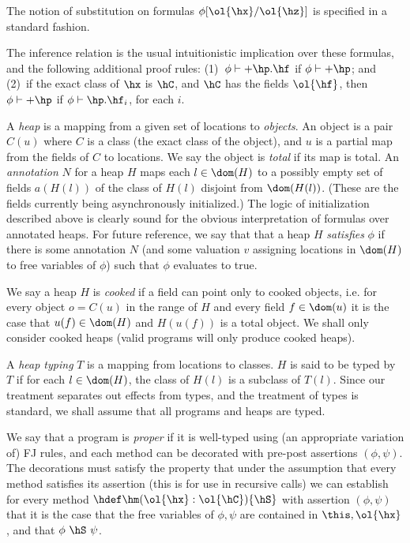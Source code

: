 The notion of substitution on formulas $\phi\char`[\ol{\hx}/\ol{\hz}\char`]$ is
specified in a standard fashion.

The inference relation is the usual intuitionistic implication over
these formulas, and the following additional proof rules: 
(1)~$\phi\vdash +\hp.\hf$ if $\phi\vdash +\hp$; and (2)~if
the exact class of $\hx$ is $\hC$, and $\hC$ has the fields $\ol{\hf}$,
then $\phi\vdash +\hp$ if $\phi\vdash \hp.\hf_i$, for each $i$. 

A {\em heap} is a mapping from a given set of locations to {\em
  objects}. An object is a pair $C(u)$ where $C$ is a class (the exact
class of the object), and $u$ is a partial map from the fields of $C$
to locations. We say the object is {\em total} if its map is total.
An {\em annotation} $N$ for a heap $H$ maps each $l \in \dom(H)$ to a
possibly empty set of fields $a(H(l))$ of the class of $H(l)$ disjoint
from $\dom(H(l))$. (These are the fields currently being
asynchronously initialized.) The logic of initialization described
above is clearly sound for the obvious interpretation of formulas over
annotated heaps. For future reference, we say that that a heap $H$
{\em satisfies} $\phi$ if there is some annotation $N$ (and some
valuation $v$ assigning locations in $\dom(H)$ to free variables of
$\phi$) such that $\phi$ evaluates to true. 

We say a heap $H$ is {\em cooked} if a field can point only to cooked
objects, i.e.{} for every object $o=C(u)$ in the range of $H$ and
every field $f \in \dom(u)$ it is the case that $u(f)\in \dom (H)$ and
$H(u(f))$ is a total object. We shall only consider cooked heaps (valid
programs will only produce cooked heaps).

A {\em heap typing} $T$ is a mapping from locations to classes. $H$ is
said to be typed by $T$ if for each $l\in\dom(H)$, the class of $H(l)$
is a subclass of $T(l)$.  Since our treatment separates out effects
from types, and the treatment of types is standard, we shall assume
that all programs and heaps are typed.

We say that a program \hP{} is {\em proper} if it is well-typed using
(an appropriate variation of) FJ rules, and each method can be
decorated with pre-post assertions $(\phi,\psi)$. The decorations must
satisfy the property that under the assumption that every method
satisfies its assertion (this is for use in recursive calls) we can
establish for every method $\hdef\hm(\ol{\hx}:\ol{\hC})\{\hS\}$ with
assertion $(\phi,\psi)$ that it is the case that the free variables of
$\phi,\psi$ are contained in $\this,\ol{\hx}$, and that
$\phi~\hS~\psi$.

